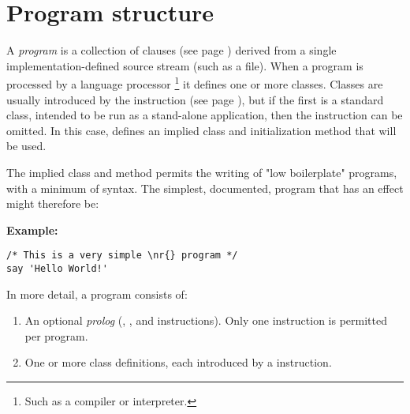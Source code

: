 \chapter{Program structure}\label{refpstruct}
 A \nr{} \emph{program} is a collection of
 clauses (see page \pageref{refclau})  derived from a single implementation-defined
source stream (such as a file).
When a program is processed by a language processor
\footnote{
Such as a compiler or interpreter.
}
it defines one or more classes.
Classes are usually introduced by the   instruction (see page \pageref{refclass}), but if the first is a standard class, intended to be
run as a stand-alone application, then the  instruction
can be omitted.  In this case, \nr{} defines an implied class
and initialization method that will be used.
 
The implied class and method permits the writing of "low
boilerplate" programs, with a minimum of syntax.
The simplest, documented, \nr{} program that has an effect might
therefore be:
 
\textbf{Example:}
\begin{lstlisting}[label=hello,caption=hello.nrx]
/* This is a very simple \nr{} program */
say 'Hello World!'
\end{lstlisting}
 
In more detail, a \nr{} program consists of:
\begin{enumerate}
\item An optional \emph{prolog} (, , and
 instructions).  Only one  instruction
is permitted per program.
\item  One or more class definitions, each introduced by a 
instruction.
\end{enumerate}
 
